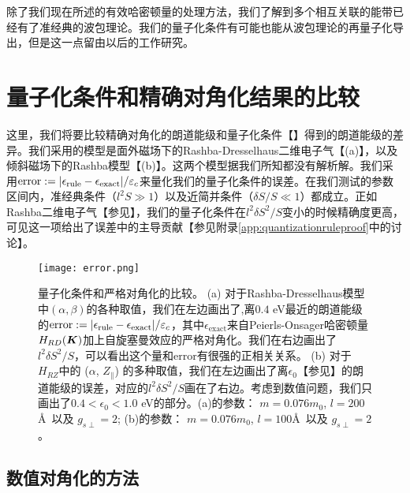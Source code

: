 \begin{appendices}
除了我们现在所述的有效哈密顿量的处理方法，我们了解到多个相互关联的能带\cite{culcer_coherent_2005}已经有了准经典的波包理论。我们的量子化条件有可能也能从波包理论的再量子化导出\cite{xiao_berry_2010}，但是这一点留由以后的工作研究。

\chapter{量子化条件和精确对角化结果的比较}\label{app:approximatevsexact}

这里，我们将要比较精确对角化的朗道能级和量子化条件【】得到的朗道能级的差异。我们采用的模型是面外磁场下的Rashba-Dresselhaus二维电子气【(a)】，以及倾斜磁场下的Rashba模型【(b)】。这两个模型据我们所知都没有解析解。我们采用$\text{error}:=|\epsilon_\text{rule}-\epsilon_\text{exact}|/\varepsilon_c$来量化我们的量子化条件的误差。在我们测试的参数区间内，准经典条件（$l^2 S\gg 1$）以及近简并条件（$\delta S/S\ll 1$）都成立。正如Rashba二维电子气【参见】，我们的量子化条件在$l^2\delta S^2/S$变小的时候精确度更高，可见这一项给出了误差中的主导贡献【参见附录\ref{app:quantizationruleproof}中的讨论】。


\begin{figure}
\texttt{[image: error.png]}
\caption{{量子化条件和严格对角化的比较。 (a) 对于Rashba-Dresselhaus模型中$(\alpha,\beta)$的各种取值，我们在左边画出了,离$0.4$ eV最近的朗道能级的$\text{error}:=|\epsilon_\text{rule}-\epsilon_\text{exact}|/\varepsilon_c$，其中$\epsilon_{\text{exact}}$来自Peierls-Onsager哈密顿量$H_{RD}(\boldsymbol{K})$加上自旋塞曼效应的严格对角化。我们在右边画出了$l^2\delta S^2/S$，可以看出这个量和$\text{error}$有很强的正相关关系。 (b) 对于$H_{RZ}$中的 ($\alpha$, $Z_\parallel$) 的多种取值，我们在左边画出了离$\epsilon_0$【参见】的朗道能级的误差，对应的$l^2 \delta S^2/S$画在了右边。考虑到数值问题，我们只画出了$0.4{<}\epsilon_0{<}1.0$ eV的部分。(a)的参数： $m=0.076m_0$, $l=200$\AA~以及 $g_{s\perp}=2$; (b)的参数： $m=0.076m_0$, $l=100$\AA~以及 $g_{s\perp}=2$。}\label{fig:error}}
\end{figure}


\section{数值对角化的方法}\label{sec:numerical}


\end{appendices}
